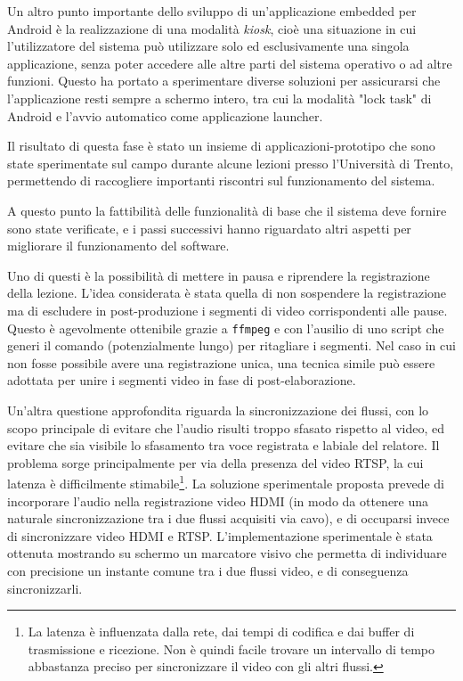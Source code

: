Un altro punto importante dello sviluppo di un'applicazione embedded per Android è la realizzazione di una modalità \textit{kiosk}, cioè una situazione in cui l'utilizzatore del sistema può utilizzare solo ed esclusivamente una singola applicazione, senza poter accedere alle altre parti del sistema operativo o ad altre funzioni. Questo ha portato a sperimentare diverse soluzioni per assicurarsi che l'applicazione resti sempre a schermo intero, tra cui la modalità "lock task" di Android e l'avvio automatico come applicazione launcher.

Il risultato di questa fase è stato un insieme di applicazioni-prototipo che sono state sperimentate sul campo durante alcune lezioni presso l'Università di Trento, permettendo di raccogliere importanti riscontri sul funzionamento del sistema.

A questo punto la fattibilità delle funzionalità di base che il sistema deve fornire sono state verificate, e i passi successivi hanno riguardato altri aspetti per migliorare il funzionamento del software.

Uno di questi è la possibilità di mettere in pausa e riprendere la registrazione della lezione. L'idea considerata è stata quella di non sospendere la registrazione ma di escludere in post-produzione i segmenti di video corrispondenti alle pause. Questo è agevolmente ottenibile grazie a \texttt{ffmpeg} e con l'ausilio di uno script che generi il comando (potenzialmente lungo) per ritagliare i segmenti. Nel caso in cui non fosse possibile avere una registrazione unica, una tecnica simile può essere adottata per unire i segmenti video in fase di post-elaborazione.

Un'altra questione approfondita riguarda la sincronizzazione dei flussi, con lo scopo principale di evitare che l'audio risulti troppo sfasato rispetto al video, ed evitare che sia visibile lo sfasamento tra voce registrata e labiale del relatore. Il problema sorge principalmente per via della presenza del video RTSP, la cui latenza è difficilmente stimabile\footnote{La latenza è influenzata dalla rete, dai tempi di codifica e dai buffer di trasmissione e ricezione. Non è quindi facile trovare un intervallo di tempo abbastanza preciso per sincronizzare il video con gli altri flussi.}. La soluzione sperimentale proposta prevede di incorporare l'audio nella registrazione video HDMI (in modo da ottenere una naturale sincronizzazione tra i due flussi acquisiti via cavo), e di occuparsi invece di sincronizzare video HDMI e RTSP. L'implementazione sperimentale è stata ottenuta mostrando su schermo un marcatore visivo che permetta di individuare con precisione un instante comune tra i due flussi video, e di conseguenza sincronizzarli.

